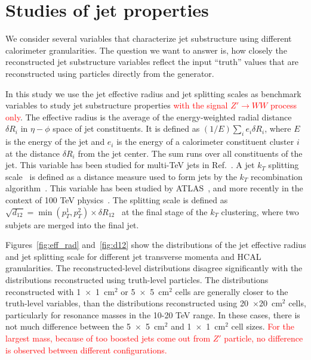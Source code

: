 \section{Studies of jet properties}
\label{sec:jets}

We consider several variables that characterize jet substructure using different calorimeter granularities. The question we want to answer is, how closely the reconstructed
jet substructure variables reflect the input ``truth'' values  that are reconstructed using particles directly from the \pythia generator.

In this study we use the jet effective radius and jet splitting scales as benchmark variables
to study jet substructure properties \textcolor{red}{with the signal $Z'\rightarrow WW$ process only}. 
The effective radius is the average of the energy-weighted radial distance $\delta R_i$ in $\eta-\phi$ space of jet constituents.
It is defined as $(1/E) \sum_i e_i \delta R_i$, where $E$ is the energy of the jet and $e_i$ is the energy of a calorimeter 
constituent cluster $i$ at the distance $\delta R_i$ from the jet center. The sum runs over all constituents of the jet. 
This variable has been studied for multi-TeV jets in Ref.~\cite{Auerbach:2014xua}.
A jet $k_T$ splitting scale~\cite{Butterworth:2002tt} is defined as a distance measure
used to form jets by the $k_T$ recombination
algorithm~\cite{Catani1993187,Ellis:1993tq}.
This variable has been studied by ATLAS~\cite{ATLAS:2012am}, and more recently in the context of 100 TeV physics~\cite{Auerbach:2014xua}.
The splitting scale is defined as $\sqrt{d_{12}}=\min(p_T^1,p_T^2) \times \delta R_{12}$~\cite{ATLAS:2012am} 
 at the final stage of the $k_T$ clustering, where two subjets are merged into the final jet.

Figures~\ref{fig:eff_rad} and~\ref{fig:d12} show the distributions of 
the jet effective radius and jet splitting scale for  different jet transverse momenta and HCAL granularities. 
The reconstructed-level distributions  disagree significantly with the distributions  
reconstructed using truth-level particles. The distributions reconstructed with 1~$\times$~1~cm$^2$ or 5~$\times$~5~cm$^2$ cells 
 are generally closer to the truth-level variables, than the distributions 
reconstructed using 20~$\times$20~cm$^2$ cells, particularly for resonance masses in the 10-20 TeV range. In these cases, there is not much  difference between the 
 5~$\times$~5~cm$^2$ and  1~$\times$~1~cm$^2$ cell sizes. \textcolor{red}{For the largest mass, because of too boosted jets come out from $Z'$ particle, no difference is observed between different configurations.}

